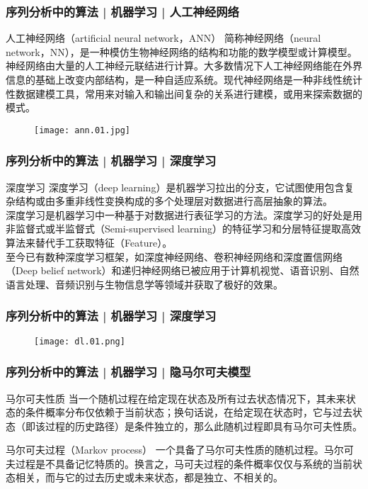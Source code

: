 \begin{frame}
  \frametitle{序列分析中的算法 | 机器学习 | 人工神经网络}
  \begin{block}{人工神经网络（artificial neural network，ANN）}
   简称神经网络（neural network，NN），是一种模仿生物神经网络的结构和功能的数学模型或计算模型。神经网络由大量的人工神经元联结进行计算。大多数情况下人工神经网络能在外界信息的基础上改变内部结构，是一种自适应系统。现代神经网络是一种非线性统计性数据建模工具，常用来对输入和输出间复杂的关系进行建模，或用来探索数据的模式。
  \end{block}
  \begin{figure}
    \centering
    \texttt{[image: ann.01.jpg]}
  \end{figure}
\end{frame}

\begin{frame}
  \frametitle{序列分析中的算法 | 机器学习 | 深度学习}
  \begin{block}{深度学习}
    深度学习（deep learning）是机器学习拉出的分支，它试图使用包含复杂结构或由多重非线性变换构成的多个处理层对数据进行高层抽象的算法。\\
    \vspace{0.5em}
深度学习是机器学习中一种基于对数据进行表征学习的方法。深度学习的好处是用非监督式或半监督式（Semi-supervised learning）的特征学习和分层特征提取高效算法来替代手工获取特征（Feature）。\\
    \vspace{0.5em}
至今已有数种深度学习框架，如深度神经网络、卷积神经网络和深度置信网络（Deep belief network）和递归神经网络已被应用于计算机视觉、语音识别、自然语言处理、音频识别与生物信息学等领域并获取了极好的效果。
  \end{block}
\end{frame}

\begin{frame}
  \frametitle{序列分析中的算法 | 机器学习 | 深度学习}
  \begin{figure}
    \centering
    \texttt{[image: dl.01.png]}
  \end{figure}
\end{frame}

\begin{frame}
  \frametitle{序列分析中的算法 | 机器学习 | 隐马尔可夫模型}
  \begin{block}{马尔可夫性质}
    当一个随机过程在给定现在状态及所有过去状态情况下，其未来状态的条件概率分布仅依赖于当前状态；换句话说，在给定现在状态时，它与过去状态（即该过程的历史路径）是条件独立的，那么此随机过程即具有马尔可夫性质。
  \end{block}
  \pause
  \begin{block}{马尔可夫过程（Markov process）}
    一个具备了马尔可夫性质的随机过程。马尔可夫过程是不具备记忆特质的。换言之，马可夫过程的条件概率仅仅与系统的当前状态相关，而与它的过去历史或未来状态，都是独立、不相关的。
  \end{block}
\end{frame}

